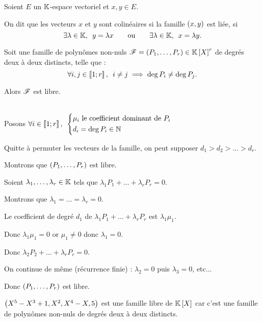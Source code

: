 \begin{defi}
Soient \(E\) un \(\mathbb{K}\)-espace vectoriel et \(x,y\in E\).

On dit que les vecteurs \(x\) et \(y\) sont colinéaires si la famille \(\left(x,y\right)\) est liée, \cad si \[\quantifs{\exists\lambda\in\K}y=\lambda x\qquad\text{ou}\qquad\quantifs{\exists\lambda\in\K}x=\lambda y.\]
\end{defi}

\begin{ex}
Soit une famille de polynômes non-nuls \(\fami{F}=\paren{P_1,\dots,P_r}\in\poly^r\) de degrés deux à deux distincts, \cad telle que : \[\quantifs{\forall i,j\in\interventierii{1}{r}}i\not=j\imp\deg P_i\not=\deg P_j.\]

Alors \(\mathscr{F}\) est libre.
\end{ex}

\begin{dem}~\\
Posons \(\quantifs{\forall i\in\interventierii{1}{r}}\begin{dcases}
\mu_i\text{ le coefficient dominant de }P_i \\
d_i=\deg P_i\in\N
\end{dcases}\)

Quitte à permuter les vecteurs de la famille, on peut supposer \(d_1>d_2>\dots>d_r\).

Montrons que \(\left(P_1,\dots,P_r\right)\) est libre.

Soient \(\lambda_1,\dots,\lambda_r\in\mathbb{K}\) tels que \(\lambda_1P_1+\dots+\lambda_rP_r=0\).

Montrons que \(\lambda_1=\dots=\lambda_r=0\).

Le coefficient de degré \(d_1\) de \(\lambda_1P_1+\dots+\lambda_rP_r\) est \(\lambda_1\mu_1\).

Donc \(\lambda_1\mu_1=0\) or \(\mu_1\not=0\) donc \(\lambda_1=0\).

Donc \(\lambda_2P_2+\dots+\lambda_rP_r=0\).

On continue de même (récurrence finie) : \(\lambda_2=0\) puis \(\lambda_3=0\), etc...

Donc \(\left(P_1,\dots,P_r\right)\) est libre.
\end{dem}

\begin{ex}
\(\left(X^5-X^3+1,X^2,X^4-X,5\right)\) est une famille libre de \(\poly\) car c'est une famille de polynômes non-nuls de degrés deux à deux distincts.
\end{ex}

